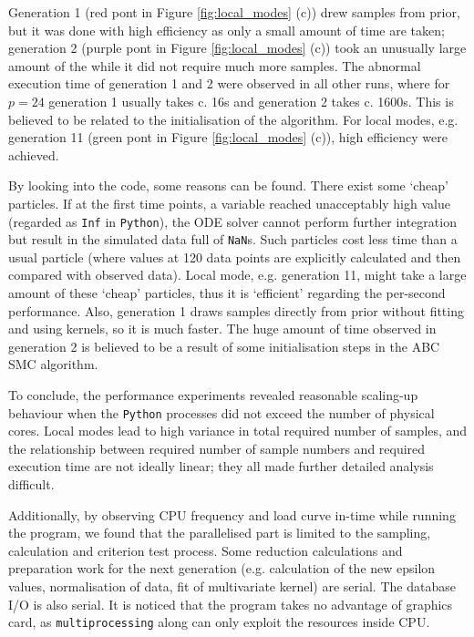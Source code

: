 
Generation 1 (red pont in Figure \ref{fig:local_modes} (c)) drew samples from prior, but it was done with high efficiency as only a small amount of time are taken; generation 2 (purple pont in Figure \ref{fig:local_modes} (c)) took an unusually large amount of the while it did not require much more samples. The abnormal execution time of generation 1 and 2 were observed in all other runs, where for $p=24$ generation 1 usually takes c. 16s and generation 2 takes c. 1600s. This is believed to be related to the initialisation of the algorithm. For local modes, e.g. generation 11 (green pont in Figure \ref{fig:local_modes} (c)), high efficiency were achieved.

By looking into the code, some reasons can be found. There exist some `cheap' particles. If at the first time points, a variable reached unacceptably high value (regarded as \verb|Inf| in \verb|Python|), the ODE solver cannot perform further integration but result in the simulated data full of \verb|NaN|s. Such particles cost less time than a usual particle (where values at 120 data points are explicitly calculated and then compared with observed data). Local mode, e.g. generation 11, might take a large amount of these `cheap' particles, thus it is `efficient' regarding the per-second performance. Also, generation 1 draws samples directly from prior without fitting and using kernels, so it is much faster. The huge amount of time observed in generation 2 is believed to be a result of some initialisation steps in the ABC SMC algorithm.

To conclude, the performance experiments revealed reasonable scaling-up behaviour when the \verb|Python| processes did not exceed the number of physical cores. Local modes lead to high variance in total required number of samples, and the relationship between required number of sample numbers and required execution time are not ideally linear; they all made further detailed analysis difficult.

Additionally, by observing CPU frequency and load curve in-time while running the program, we found that the parallelised part is limited to the sampling, calculation and criterion test process. Some reduction calculations and preparation work for the next generation (e.g. calculation of the new epsilon values, normalisation of data, fit of multivariate kernel) are serial. The database I/O is also serial.  It is noticed that the program takes no advantage of graphics card, as \verb|multiprocessing| along can only exploit the resources inside CPU. 

